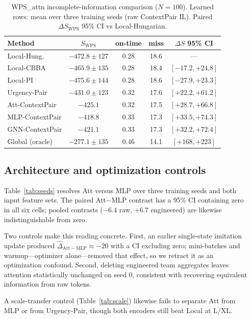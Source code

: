 \documentclass[journal,twocolumn,10pt]{IEEEtran}
\begin{document}
\begin{table}[t]
\centering
\caption{WPS\_attn incomplete-information comparison (\(N{=}100\)). Learned rows: mean over three training seeds (raw ContextPair IL). Paired \(\Delta S_{\mathrm{WPS}}\) 95\% CI vs Local-Hungarian.}
\label{tab:attn}
\setlength{\tabcolsep}{3pt}
\begin{tabular}{lcccc}
\toprule
Method & \(S_{\mathrm{WPS}}\) & on-time & miss & \(\Delta S\) 95\% CI \\
\midrule
Local-Hung. & $-472.8\pm127$ & 0.28 & 18.6 & --- \\
Local-CBBA & $-465.9\pm135$ & 0.28 & 18.4 & $[-17.2,+24.8]$ \\
Local-PI & $-475.6\pm144$ & 0.28 & 18.6 & $[-27.9,+23.3]$ \\
Urgency-Pair & $-431.0\pm123$ & 0.32 & 17.6 & $[+22.2,+61.2]$ \\
Att-ContextPair & $-425.1$ & 0.32 & 17.5 & $[+28.7,+66.8]$ \\
MLP-ContextPair & $-418.8$ & 0.33 & 17.3 & $[+33.5,+74.3]$ \\
GNN-ContextPair & $-421.1$ & 0.33 & 17.3 & $[+32.2,+72.4]$ \\
Global (oracle) & $-277.1\pm135$ & 0.46 & 14.1 & $[+168,+223]$ \\
\bottomrule
\end{tabular}
\end{table}

\subsection{Architecture and optimization controls}
\label{sec:optconfound}
Table~\ref{tab:seeds} resolves Att versus MLP over three training seeds and both input feature sets.
The paired Att$-$MLP contrast has a 95\% CI containing zero in all six cells; pooled contrasts (\(-6.4\) raw, \(+6.7\) engineered) are likewise indistinguishable from zero.

Two controls make this reading concrete.
First, an earlier single-state imitation update produced \(\widehat{\Delta}_{\mathrm{Att-MLP}}\approx-20\) with a CI excluding zero; mini-batches and warmup---optimizer alone---removed that effect, so we retract it as an optimization confound.
Second, deleting engineered team aggregates leaves attention statistically unchanged on seed 0, consistent with recovering equivalent information from raw tokens.

A scale-transfer control (Table~\ref{tab:scale}) likewise fails to separate Att from MLP or from Urgency-Pair, though both encoders still beat Local at L/XL.
\end{document}
